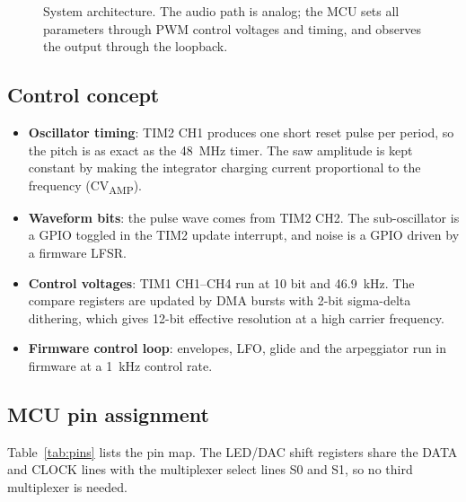 \documentclass[11pt,a4paper]{article}
\newcommand{\sub}[1]{\textsubscript{#1}}
\begin{document}
\begin{figure}[ht]
{}
\caption{System architecture. The audio path is analog; the MCU sets all parameters through PWM control voltages
and timing, and observes the output through the loopback.}
\label{fig:block}
\end{figure}

\subsection{Control concept}
\begin{itemize}
  \item \textbf{Oscillator timing}: TIM2 CH1 produces one short reset pulse per period, so the pitch is as
    exact as the \SI{48}{MHz} timer. The saw amplitude is kept constant by making the integrator charging
    current proportional to the frequency (CV\sub{AMP}).
  \item \textbf{Waveform bits}: the pulse wave comes from TIM2 CH2. The sub-oscillator is a GPIO toggled in
    the TIM2 update interrupt, and noise is a GPIO driven by a firmware LFSR.
  \item \textbf{Control voltages}: TIM1 CH1--CH4 run at 10 bit and \SI{46.9}{kHz}. The compare registers
    are updated by DMA bursts with 2-bit sigma-delta dithering, which gives 12-bit effective resolution at
    a high carrier frequency.
  \item \textbf{Firmware control loop}: envelopes, LFO, glide and the arpeggiator run in firmware at a
    \SI{1}{kHz} control rate.
\end{itemize}

\subsection{MCU pin assignment}
Table~\ref{tab:pins} lists the pin map. The LED/DAC shift registers share the DATA and CLOCK lines with the
multiplexer select lines S0 and S1, so no third multiplexer is needed.
\end{document}
